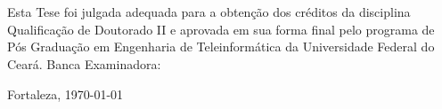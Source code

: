 \thispagestyle{empty}%

\begin{center}
    \textsc{ \autor } \\
     \vspace{.5 cm} \textbf{ \titulo }     \\
\end{center}
    \vspace{.2 cm}
    Esta Tese foi julgada adequada para a obten\c{c}\~{a}o dos cr\'{e}ditos da disciplina Qualifica\c{c}\~{a}o de Doutorado II e aprovada em sua forma final pelo programa de P\'{o}s Gradua\c{c}\~{a}o em Engenharia de Teleinform\'{a}tica da Universidade Federal do Cear\'{a}.
    \assinatura{\autor}
    \vspace{0.2 cm}
     Banca Examinadora:
     \assinatura{\membroa}
     \assinatura{\membrob}
     \assinatura{\membroc}
     \assinatura{\membrod}
     \vspace{0.2 cm}%

\begin{center}
    {\normalsize    Fortaleza, \today}
\end{center}
